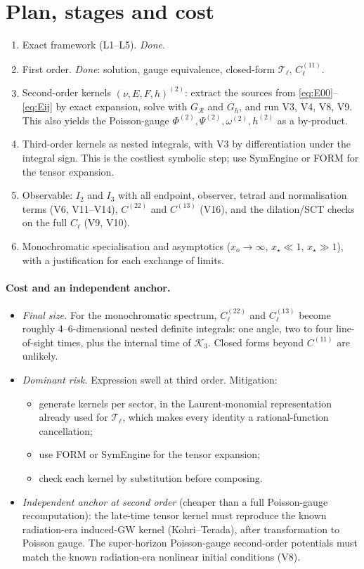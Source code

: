 \documentclass[11pt]{article}
\theoremstyle{definition}
\theoremstyle{remark}
\begin{document}
\section{Plan, stages and cost}\label{sec:plan}
\begin{enumerate}
\item[S0] Exact framework (L1--L5). \emph{Done}.
\item[S1] First order. \emph{Done}: solution, gauge equivalence, closed-form
$\mathcal T_\ell$, $C^{(11)}_\ell$.
\item[S2] Second-order kernels $(\nu,E,F,h)^{(2)}$: extract the sources from
\eqref{eq:E00}--\eqref{eq:Eij} by exact expansion, solve with
$G_{\mathcal R}$ and $G_h$, and run V3, V4, V8, V9. This also yields the
Poisson-gauge $\Phi^{(2)},\Psi^{(2)},\omega^{(2)},h^{(2)}$ as a
by-product.
\item[S3] Third-order kernels as nested integrals, with V3 by
differentiation under the integral sign. This is the costliest symbolic
step; use SymEngine or FORM for the tensor expansion.
\item[S4] Observable: $I_2$ and $I_3$ with all endpoint, observer, tetrad
and normalisation terms (V6, V11--V14), $C^{(22)}$ and $C^{(13)}$ (V16), and
the dilation/SCT checks on the full $C_\ell$ (V9, V10).
\item[S5] Monochromatic specialisation and asymptotics ($x_o\to\infty$,
$x_\star\ll1$, $x_\star\gg1$), with a justification for each exchange of
limits.
\end{enumerate}

\paragraph{Cost and an independent anchor.}
\begin{itemize}
\item \emph{Final size.} For the monochromatic spectrum,
$C^{(22)}_\ell$ and $C^{(13)}_\ell$ become roughly 4--6-dimensional nested
definite integrals: one angle, two to four line-of-sight times, plus the
internal time of $\mathcal K_3$. Closed forms beyond $C^{(11)}$ are
unlikely.
\item \emph{Dominant risk.} Expression swell at third order. Mitigation:
\begin{itemize}
\item generate kernels per sector, in the Laurent-monomial representation
already used for $\mathcal T_\ell$, which makes every identity a
rational-function cancellation;
\item use FORM or SymEngine for the tensor expansion;
\item check each kernel by substitution before composing.
\end{itemize}
\item \emph{Independent anchor at second order} (cheaper than a full
Poisson-gauge recomputation): the late-time tensor kernel must reproduce
the known radiation-era induced-GW kernel (Kohri--Terada), after
transformation to Poisson gauge. The super-horizon Poisson-gauge
second-order potentials must match the known radiation-era nonlinear
initial conditions (V8).
\end{itemize}
\end{document}
